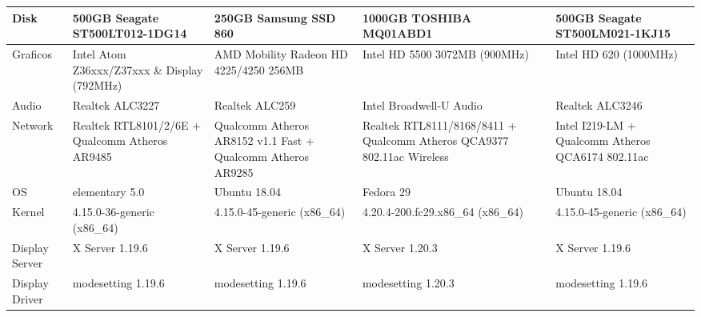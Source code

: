 \documentclass{article}
\begin{document}
\begin{table}[H]
\begin{tabularx}{\linewidth}{|L|L|L|L|L|}
Disk                   & 500GB Seagate ST500LT012-1DG14                         & 250GB Samsung SSD 860                                       & 1000GB TOSHIBA MQ01ABD1                                                & 500GB Seagate ST500LM021-1KJ15                           \\ \hline
{}Graficos               & Intel Atom Z36xxx/Z37xxx \& Display (792MHz)           & AMD Mobility Radeon HD 4225/4250 256MB                      & Intel HD 5500 3072MB (900MHz)                                          & Intel HD 620 (1000MHz)                                   \\ \hline
{}Audio                  & Realtek ALC3227                                        & Realtek ALC259                                              & Intel Broadwell-U Audio                                                & Realtek ALC3246                                          \\ \hline
{}Network                & Realtek RTL8101/2/6E + Qualcomm Atheros AR9485         & Qualcomm Atheros AR8152 v1.1 Fast + Qualcomm Atheros AR9285 & Realtek RTL8111/8168/8411 + Qualcomm Atheros QCA9377 802.11ac Wireless & Intel I219-LM + Qualcomm Atheros QCA6174 802.11ac        \\ \hline
{}OS                     & elementary 5.0                                         & Ubuntu 18.04                                                & Fedora 29                                                              & Ubuntu 18.04                                             \\ \hline
{}Kernel                 & 4.15.0-36-generic (x86\_64)                            & 4.15.0-45-generic (x86\_64)                                 & 4.20.4-200.fc29.x86\_64 (x86\_64)                                      & 4.15.0-45-generic (x86\_64)                              \\ \hline
{}Display Server         & X Server 1.19.6                                        & X Server 1.19.6                                             & X Server 1.20.3                                                        & X Server 1.19.6                                          \\ \hline
{}Display Driver         & modesetting 1.19.6                                     & modesetting 1.19.6                                          & modesetting 1.20.3                                                     & modesetting 1.19.6                                       \\ \hline

\end{tabularx}
\end{table}
\end{document}
